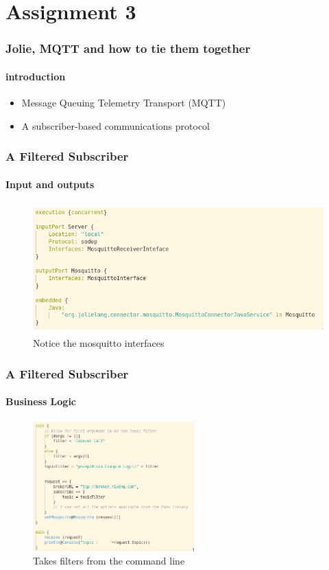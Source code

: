 \documentclass{beamer}
\begin{document}
    \section{Assignment 3}
    \begin{frame}[t]
        \frametitle{Jolie, MQTT and how to tie them together}
        \framesubtitle{introduction}
        \begin{itemize}
            \item Message Queuing Telemetry Transport (MQTT)
            \item A subscriber-based communications protocol
        \end{itemize}
    \end{frame}
    \begin{frame}[t]
        \frametitle{A Filtered Subscriber}
        \framesubtitle{Input and outputs}
        \begin{figure}[!h]
            \centering
            \includegraphics[height=5cm]{images3/filterio.png}
            \caption{Notice the mosquitto interfaces}
            \label{fig:a3p1}
        \end{figure}
    \end{frame}
    \begin{frame}[t]
        \frametitle{A Filtered Subscriber}
        \framesubtitle{Business Logic}
        \begin{figure}[!h]
            \centering
            \includegraphics[height=5cm]{images3/filterlogic.png}
            \caption{Takes filters from the command line}
            \label{fig:a3p1}
        \end{figure}
    \end{frame}
\end{document}
